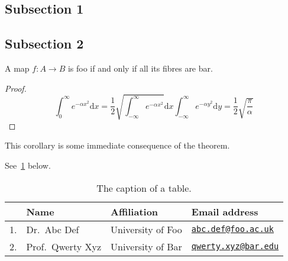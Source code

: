 \subsection{Subsection 1}

\lipsum[5]

\subsection{Subsection 2}

\lipsum[7]

\begin{theorem}\label{thm}
  A map \(f : A \to B\) is foo if and only if all its fibres are bar.
\end{theorem}
\begin{proof}
  \lipsum[7]
  \[
    \int_0^\infty e^{-\alpha x^2} \mathrm{d}x =
    \frac12\sqrt{\int_{-\infty}^\infty e^{-\alpha x^2}}
    \mathrm{d}x\int_{-\infty}^\infty e^{-\alpha y^2}\mathrm{d}y =
    \frac12\sqrt{\frac{\pi}{\alpha}}
  \]
  \lipsum[8]
\end{proof}

\begin{corollary}
  This corollary is some immediate consequence of the theorem.
\end{corollary}

\begin{remark}
  \lipsum[1-2]
\end{remark}

\begin{example}
  \lipsum[5]
\end{example}

See~\cref{table} below.
\begin{table}[h]%
  \centering
  \begin{tabular}{llp{4cm}l}\toprule
    & Name & Affiliation & Email address \\\midrule
    1. & Dr.~Abc Def
       & University of Foo
       & \href{mailto:abc.def@foo.ac.uk}{\texttt{abc.def@foo.ac.uk}} \\
    2. & Prof.~Qwerty Xyz
       & University of Bar
       & \href{mailto:qwerty.xyz@bar.ac.uk}{\texttt{qwerty.xyz@bar.edu}}
  \end{tabular}
  \caption{The caption of a table.}
  \label{table}
\end{table}


